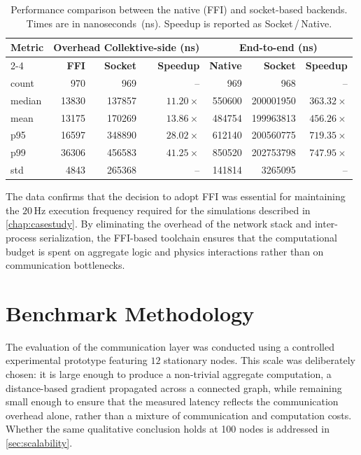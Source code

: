 \begin{table}[t]
    \centering
    \caption{Performance comparison between the native (\ac{FFI}) and socket-based backends. Times are in nanoseconds~(ns). Speedup is reported as Socket\,/\,Native.}
    \label{tab:benchmark}
    \setlength{\tabcolsep}{6pt}
    \renewcommand{\arraystretch}{1.15}
    \begin{tabular}{lrrrrrr}
        \hline
        \textbf{Metric}
            & \multicolumn{3}{c}{\textbf{Overhead Collektive-side (ns)}}
            & \multicolumn{3}{c}{\textbf{End-to-end (ns)}} \\
        \cline{2-4}\cline{5-7}
            & \textbf{FFI} & \textbf{Socket} & \textbf{Speedup}
            & \textbf{Native} & \textbf{Socket} & \textbf{Speedup} \\
        \hline
        count  & 970    & 969     & --           & 969    & 968         & --           \\
        median & 13830  & 137857  & $11.20\times$  & 550600  & 200001950   & $363.32\times$ \\
        mean   & 13175  & 170269  & $13.86\times$  & 484754  & 199963813   & $456.26\times$ \\
        p95    & 16597  & 348890  & $28.02\times$  & 612140  & 200560775   & $719.35\times$ \\
        p99    & 36306  & 456583  & $41.25\times$  & 850520  & 202753798   & $747.95\times$ \\
        std    & 4843   & 265368  & --           & 141814  & 3265095     & --           \\
        \hline
    \end{tabular}
\end{table}

The data confirms that the decision to adopt \ac{FFI} was essential for maintaining the $20\,\text{Hz}$ execution frequency required for the simulations described in \cref{chap:casestudy}. By eliminating the overhead of the network stack and inter-process serialization, the \ac{FFI}-based toolchain ensures that the computational budget is spent on aggregate logic and physics interactions rather than on communication bottlenecks.

\section{Benchmark Methodology}

The evaluation of the communication layer was conducted using a controlled experimental prototype featuring $12$ stationary nodes. This scale was deliberately chosen: it is large enough to produce a non-trivial aggregate computation, a distance-based gradient propagated across a connected graph, while remaining small enough to ensure that the measured latency reflects the communication overhead alone, rather than a mixture of communication and computation costs. Whether the same qualitative conclusion holds at 100 nodes is addressed in \cref{sec:scalability}.

